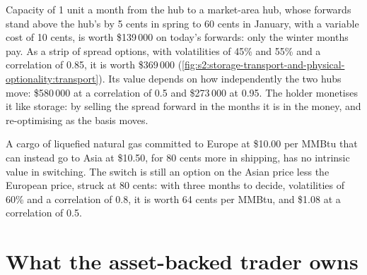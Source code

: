 Capacity of 1 unit a month from the hub to a market-area hub, whose forwards stand above the hub's by 5 cents in spring to 60 cents in January, with a
variable cost of 10 cents, is worth \$139\,000 on today's forwards: only the winter months pay. As a strip of spread options, with volatilities of 45\%
and 55\% and a correlation of 0.85, it is worth \$369\,000 (\cref{fig:s2:storage-transport-and-physical-optionality:transport}). Its value depends on
how independently the two hubs move: \$580\,000 at a correlation of 0.5 and \$273\,000 at 0.95. The holder monetises it like storage: by selling the
spread forward in the months it is in the money, and re-optimising as the basis moves.

\begin{omfigure}

\label{fig:s2:storage-transport-and-physical-optionality:transport}
\end{omfigure}

A cargo of liquefied natural gas committed to Europe at \$10.00 per MMBtu that can instead go to Asia at \$10.50, for 80 cents more in shipping,
has no intrinsic value in switching. The switch is still an option on the Asian price less the European price, struck at 80 cents: with three months
to decide, volatilities of 60\% and a correlation of 0.8, it is worth 64 cents per MMBtu, and \$1.08 at a correlation of 0.5.

\section{What the asset-backed trader owns}

